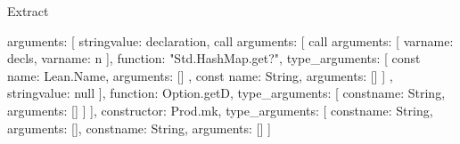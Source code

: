 \begin{lexlean}{Extract}
\begin{toolingmodule}
{{{{{{{{{{{{{{{{{{                                                          arguments: [
                                                            string{value: declaration},
                                                            call{
                                                              arguments: [
                                                                call{
                                                                  arguments: [
                                                                    var{name: decls},
                                                                    var{name: n}
                                                                  ],
                                                                  function: "Std.HashMap.get?",
                                                                  type_arguments: [
                                                                    const{
                                                                      name: Lean.Name,
                                                                      arguments: []
                                                                    },
                                                                    const{
                                                                      name: String,
                                                                      arguments: []
                                                                    }
                                                                  ]
                                                                },
                                                                string{value: null}
                                                              ],
                                                              function: Option.getD,
                                                              type_arguments: [
                                                                const{name: String, arguments: []}
                                                              ]
                                                            }
                                                          ],
                                                          constructor: Prod.mk,
                                                          type_arguments: [
                                                            const{name: String, arguments: []},
                                                            const{name: String, arguments: []}
                                                          ]
}}}}}}}}}}}}}}}}}}
\end{toolingmodule}
\end{lexlean}
